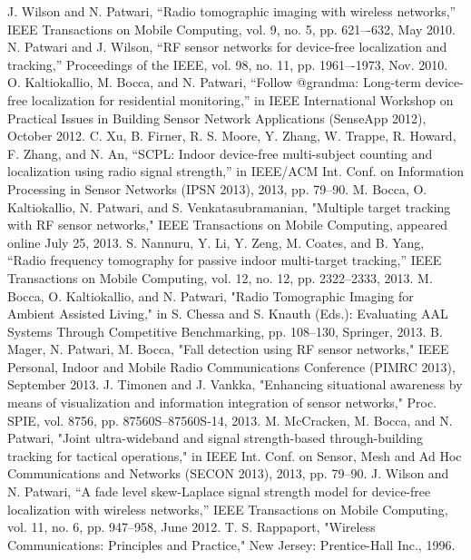 \documentclass[conference]{IEEEtran}
\begin{document}
\begin{thebibliography}{49}
 J. Wilson and N. Patwari, “Radio tomographic imaging with wireless networks,” IEEE Transactions on Mobile Computing, vol. 9, no. 5, pp. 621–-632, May 2010.
 N. Patwari and J. Wilson, “RF sensor networks for device-free localization and tracking,” Proceedings of the IEEE, vol. 98, no. 11, pp. 1961–-1973, Nov. 2010.
 O. Kaltiokallio, M. Bocca, and N. Patwari, “Follow @grandma: Long-term device-free localization for residential monitoring,” in IEEE International Workshop on Practical Issues in Building Sensor Network Applications (SenseApp 2012), October 2012.
 C. Xu, B. Firner, R. S. Moore, Y. Zhang, W. Trappe, R. Howard, F. Zhang, and N. An, “SCPL: Indoor device-free multi-subject counting and localization using radio signal strength,” in IEEE/ACM Int. Conf. on Information Processing in Sensor Networks (IPSN 2013), 2013, pp. 79--90.
 M. Bocca, O. Kaltiokallio, N. Patwari, and S. Venkatasubramanian, "Multiple target tracking with {RF} sensor networks," IEEE Transactions on Mobile Computing, appeared online July 25, 2013.
 S. Nannuru, Y. Li, Y. Zeng, M. Coates, and B. Yang, “Radio frequency tomography for passive indoor multi-target tracking,” IEEE Transactions on Mobile Computing, vol. 12, no. 12, pp. 2322--2333, 2013.
 M. Bocca, O. Kaltiokallio, and N. Patwari, "Radio Tomographic Imaging for Ambient Assisted Living," in S. Chessa and S. Knauth (Eds.): Evaluating AAL Systems Through Competitive Benchmarking, pp. 108--130, Springer, 2013.
 B. Mager, N. Patwari, M. Bocca, "Fall detection using {RF} sensor networks," IEEE Personal, Indoor and Mobile Radio Communications Conference (PIMRC 2013), September 2013.
 J. Timonen and J. Vankka, "Enhancing situational awareness by means of visualization and information integration of sensor networks," Proc. SPIE, vol. 8756, pp. 87560S--87560S-14, 2013.
 M. McCracken, M. Bocca, and N. Patwari, "Joint ultra-wideband and signal strength-based through-building tracking for tactical operations," in IEEE Int. Conf. on Sensor, Mesh and Ad Hoc Communications and Networks (SECON 2013), 2013, pp. 79--90.
 J. Wilson and N. Patwari, “A fade level skew-Laplace signal strength model for device-free localization with wireless networks,” IEEE Transactions on Mobile Computing, vol. 11, no. 6, pp. 947--958, June 2012.
 T. S. Rappaport, "Wireless Communications: Principles and Practice," New Jersey: Prentice-Hall Inc., 1996.

\end{thebibliography}
\end{document}

